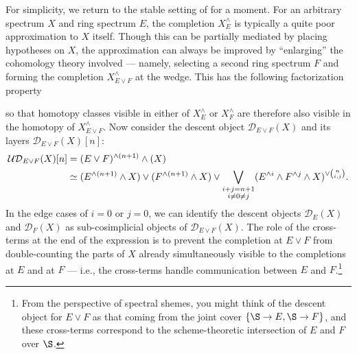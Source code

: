 For simplicity, we return to the stable setting of  for a moment.  For an arbitrary spectrum $X$ and ring spectrum $E$, the completion $X^\wedge_E$ is typically a quite poor approximation to $X$ itself.  Though this can be partially mediated by placing hypotheses on $X$, the approximation can always be improved by ``enlarging'' the cohomology theory involved --- namely, selecting a second ring spectrum $F$ and forming the completion $X^\wedge_{E \vee F}$ at the wedge.  This has the following factorization property
\begin{center}
\end{center}
so that homotopy classes visible in either of $X^\wedge_E$ or $X^\wedge_F$ are therefore also visible in the homotopy of $X^\wedge_{E \vee F}$.  Now consider the descent object $\mathcal D_{E \vee F}(X)$ and its layers $\mathcal D_{E \vee F}(X)[n]$:
\begin{align*}
\mathcal{UD}_{E \vee F}(X)[n] & = (E \vee F)^{\wedge (n+1)} \wedge (X) \\
& \simeq (E^{\wedge (n+1)} \wedge X) \vee (F^{\wedge (n+1)} \wedge X) \vee \bigvee_{\substack{i+j=n+1 \\ i \ne 0 \ne j}} (E^{\wedge i} \wedge F^{\wedge j} \wedge X)^{\vee \binom{n}{i,j}}.
\end{align*}
In the edge cases of $i = 0$ or $j = 0$, we can identify the descent objects $\mathcal D_E(X)$ and $\mathcal D_F(X)$ as sub-cosimplicial objects of $\mathcal D_{E \vee F}(X)$.  The role of the cross-terms at the end of the expression is to prevent the completion at $E \vee F$ from double-counting the parts of $X$ already simultaneously visible to the completions at $E$ and at $F$ --- i.e., the cross-terms handle communication between $E$ and $F$.\footnote{From the perspective of spectral shemes, you might think of the descent object for $E \vee F$ as that coming from the joint cover $\{\S \to E, \S \to F\}$, and these cross-terms correspond to the scheme-theoretic intersection of $E$ and $F$ over $\S$.}

